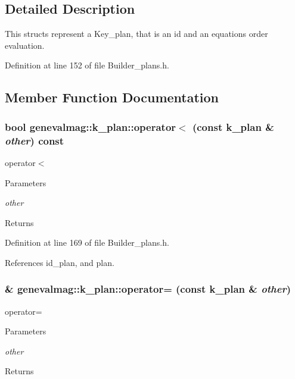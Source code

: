 \subsection{Detailed Description}
This structs represent a Key\_\-plan, that is an id and an equations order evaluation. 

Definition at line 152 of file Builder\_\-plans.h.



\subsection{Member Function Documentation}
\hypertarget{structgenevalmag_1_1k__plan_a86eb6ce02cbf73824a1f34603cfc6b9f}{
\subsubsection[{operator$<$}]{\setlength{\rightskip}{0pt plus 5cm}bool genevalmag::k\_\-plan::operator$<$ (const {\bf k\_\-plan} \& {\em other}) const}}
\label{structgenevalmag_1_1k__plan_a86eb6ce02cbf73824a1f34603cfc6b9f}
operator$<$ 
\begin{DoxyParams}{Parameters}
\item[{\em other}]\end{DoxyParams}
\begin{DoxyReturn}{Returns}

\end{DoxyReturn}


Definition at line 169 of file Builder\_\-plans.h.



References id\_\-plan, and plan.

\hypertarget{structgenevalmag_1_1k__plan_a1e209c36e06a2f83d17287e7e31f5ba8}{
\subsubsection[{operator=}]{\& genevalmag::k\_\-plan::operator= (const {\bf k\_\-plan} \& {\em other})}}
\label{structgenevalmag_1_1k__plan_a1e209c36e06a2f83d17287e7e31f5ba8}
operator= 
\begin{DoxyParams}{Parameters}
\item[{\em other}]\end{DoxyParams}
\begin{DoxyReturn}{Returns}

\end{DoxyReturn}


